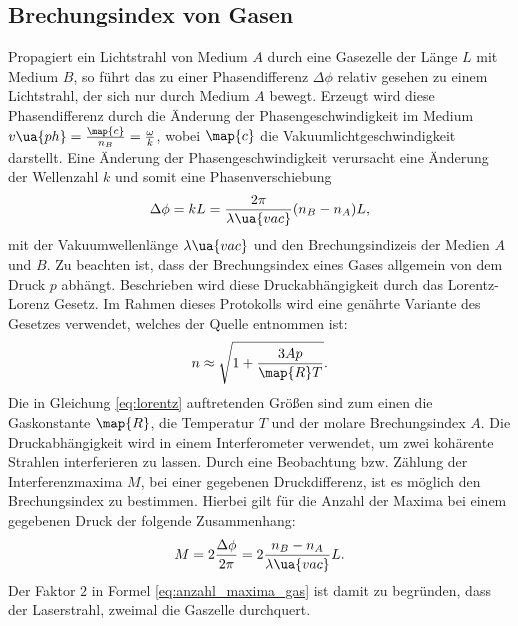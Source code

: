 \subsection{Brechungsindex von Gasen}
Propagiert ein Lichtstrahl von Medium $A$ durch eine Gasezelle der Länge $L$ mit Medium $B$,
so führt das zu einer Phasendifferenz $\Delta\phi$ relativ gesehen zu einem Lichtstrahl, der sich
nur durch Medium $A$ bewegt. Erzeugt wird diese Phasendifferenz durch die Änderung der
Phasengeschwindigkeit im Medium $v\ua{ph}=\frac{\map{c}}{n_B}=\frac{\omega}{k}$, wobei $\map{c}$
die Vakuumlichtgeschwindigkeit darstellt. Eine Änderung der Phasengeschwindigkeit
verursacht eine Änderung der Wellenzahl $k$ und somit eine Phasenverschiebung
\begin{equation}
  \label{eq:phase_shit_gases}
\Delta\phi = kL = \frac{2\pi}{\lambda\ua{vac}}(n_B-n_A)L,
\end{equation}
mit der Vakuumwellenlänge $\lambda\ua{vac}$ und den Brechungsindizeis der
Medien $A$ und $B$.
Zu beachten ist, dass der Brechungsindex eines Gases allgemein von dem Druck $p$ abhängt.
Beschrieben wird diese Druckabhängigkeit durch das Lorentz-Lorenz Gesetz.
Im Rahmen dieses Protokolls wird eine genährte Variante des Gesetzes verwendet,
welches der Quelle \cite{lorentz} entnommen ist:
\begin{equation}
  \label{eq:lorentz}
  n\approx \sqrt{1+\frac{ 3Ap }{ \map{R}T } }.
\end{equation}
Die in Gleichung \eqref{eq:lorentz} auftretenden Größen sind
zum einen die Gaskonstante $\map{R}$, die Temperatur $T$ und der
molare Brechungsindex $A$.
Die Druckabhängigkeit wird in einem Interferometer verwendet, um zwei kohärente Strahlen interferieren zu lassen.
Durch eine Beobachtung bzw. Zählung der Interferenzmaxima $M$, bei einer gegebenen Druckdifferenz, ist es möglich den Brechungsindex zu bestimmen.
Hierbei gilt für die Anzahl der Maxima bei einem gegebenen Druck der folgende Zusammenhang:
\begin{equation}
  \label{eq:anzahl_maxima_gas}
  M=2\frac{\Delta\phi}{2\pi}= 2\frac{ n_B-n_A }{ \lambda\ua{vac} }L.
\end{equation}
Der Faktor $2$ in Formel \eqref{eq:anzahl_maxima_gas} ist damit zu begründen, dass der Laserstrahl, zweimal die Gaszelle durchquert.
